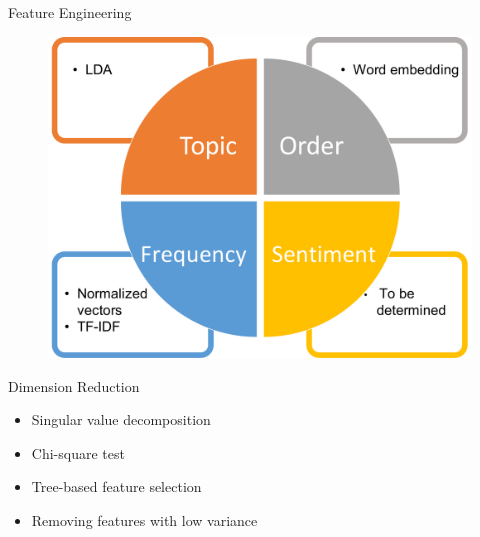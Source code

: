 \documentclass[10pt]{beamer}
\begin{document}
\begin{frame}{Feature Engineering}
   \begin{figure}
    \centering
    \includegraphics[scale=0.35]{feateng.pdf}
    
\end{figure}     
\end{frame}
\begin{frame}{Dimension Reduction}
\begin{itemize}
	\item Singular value decomposition
	\item Chi-square test
	\item Tree-based feature selection
	\item Removing features with low variance
\end{itemize}
\end{frame}
\end{document}

